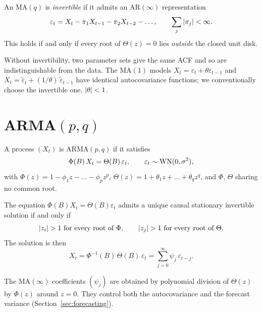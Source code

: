\begin{defbox}[Invertibility]
\label{def:invert}
An MA$(q)$ is \emph{invertible} if it admits an AR$(\infty)$
representation
\[
  \varepsilon_t = X_t - \pi_1 X_{t-1} - \pi_2 X_{t-2} - \dots,
  \qquad \sum_{j} \left\lvert \pi_j \right\rvert < \infty.
\]
This holds if and only if every root of $\Theta(z) = 0$ lies
\emph{outside} the closed unit disk.
\end{defbox}

\begin{rembox}
Without invertibility, two parameter sets give the same ACF and so
are indistinguishable from the data. The MA$(1)$ models
$X_t = \varepsilon_t + \theta \varepsilon_{t-1}$ and
$X_t = \tilde\varepsilon_t + (1/\theta)\, \tilde\varepsilon_{t-1}$
have identical autocovariance functions; we conventionally choose
the invertible one, $\left\lvert \theta \right\rvert < 1$.
\end{rembox}

\section{ARMA$(p, q)$}
\label{sec:arma}

\begin{defbox}[ARMA$(p, q)$]
\label{def:arma}
A process $(X_t)$ is ARMA$(p, q)$ if it satisfies
\[
  \Phi(B)\, X_t = \Theta(B)\, \varepsilon_t,
  \qquad \varepsilon_t \sim \mathrm{WN}(0, \sigma^2),
\]
with $\Phi(z) = 1 - \phi_1 z - \dots - \phi_p z^p$,
$\Theta(z) = 1 + \theta_1 z + \dots + \theta_q z^q$, and $\Phi$,
$\Theta$ sharing no common root.
\end{defbox}

\begin{propbox}
\label{prop:arma}
The equation $\Phi(B) X_t = \Theta(B) \varepsilon_t$ admits a
unique causal stationary invertible solution if and only if
\[
  \left\lvert z_i \right\rvert > 1 \text{ for every root of } \Phi,
  \qquad
  \left\lvert z_j \right\rvert > 1 \text{ for every root of } \Theta.
\]
The solution is then
\[
  X_t = \Phi^{-1}(B)\, \Theta(B)\, \varepsilon_t
      = \sum_{j = 0}^{\infty} \psi_j\, \varepsilon_{t-j}.
\]
\end{propbox}

\begin{rembox}
The MA$(\infty)$ coefficients $(\psi_j)$ are obtained by polynomial
division of $\Theta(z)$ by $\Phi(z)$ around $z = 0$. They
control both the autocovariance and the forecast variance
(Section~\ref{sec:forecasting}).
\end{rembox}

